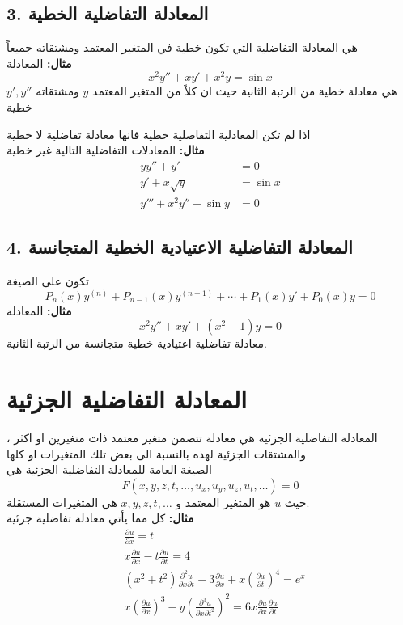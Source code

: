 \subsection*{3. المعادلة التفاضلية الخطية}
هي المعادلة التفاضلية التي تكون خطية في المتغير المعتمد ومشتقاته جميعاً\\
\textbf{مثال:} المعادلة
\begin{equation}
	x^2y'' + xy' + x^2 y = \sin x
\end{equation}
هي معادلة خطية من الرتبة الثانية حيث ان كلاً من المتغير المعتمد $y$ ومشتقاته $y', y''$ خطية

اذا لم تكن المعادلية التفاضلية خطية فانها معادلة تفاضلية لا خطية\\
\textbf{مثال:} المعادلات التفاضلية التالية غير خطية
\begin{align}
	yy'' + y' &=0\\[5pt]
	y' + x\sqrt{y} &= \sin x\\[5pt]
	y''' + x^2 y'' + \sin y &= 0
\end{align}

\subsection*{4. المعادلة التفاضلية الاعتيادية الخطية المتجانسة}
تكون على الصيغة
\begin{equation}
	P_n(x) y^{(n)} + P_{n-1}(x) y^{(n-1)}+ \cdots + P_1(x) y' + P_0(x) y = 0
\end{equation}
\textbf{مثال:} المعادلة
\begin{equation}
	x^2 y'' + xy' + (x^2 - 1) y =0
\end{equation}
معادلة تفاضلية اعتيادية خطية متجانسة من الرتبة الثانية.

\setcounter{equation}{0}
\section[المعادلة التفاضلية الجزئية]{المعادلة التفاضلية الجزئية \cite{pde1}}
المعادلة التفاضلية الجزئية هي معادلة تتضمن متغير معتمد ذات متغيرين او اكثر ، والمشتقات الجزئية لهذه بالنسبة الى بعض تلك المتغيرات او كلها\\ [5pt]
الصيغة العامة للمعادلة التفاضلية الجزئية هي 
\begin{equation}
	F(x,y,z,t,\dots,u_x, u_y, u_z, u_t, \dots) = 0
\end{equation}
حيث $u$ هو المتغير المعتمد و $x,y,z,t,\dots$ هي المتغيرات المستقلة.\\[5pt]
\textbf{مثال:} كل مما يأتي معادلة تفاضلية جزئية
\begin{align}
	&\frac{\partial u}{\partial x} = t\\[5pt]
	&x\frac{\partial u}{\partial x} - t\frac{\partial u}{\partial t} = 4\\[5pt]
	&(x^2 + t^2)\frac{\partial^2 u}{\partial x\partial t} - 3\frac{\partial u}{\partial x} + x\left(\frac{\partial u}{\partial t}\right)^4 = e^x\\[5pt]
	&x\left(\frac{\partial u}{\partial x}\right)^3 - y\left(\frac{\partial^3 u}{\partial x\partial t^2}\right)^2 = 6x\frac{\partial u}{\partial x} \frac{\partial u}{\partial t}
\end{align}

